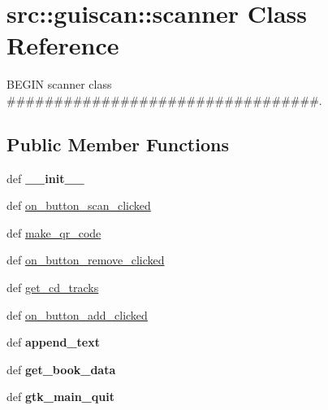 \hypertarget{classsrc_1_1guiscan_1_1scanner}{
\section{src::guiscan::scanner Class Reference}
\label{classsrc_1_1guiscan_1_1scanner}
}


BEGIN scanner class \#\#\#\#\#\#\#\#\#\#\#\#\#\#\#\#\#\#\#\#\#\#\#\#\#\#\#\#\#\#\#\#\#.  


\subsection*{Public Member Functions}
\begin{DoxyCompactItemize}
\item 
\hypertarget{classsrc_1_1guiscan_1_1scanner_ad868d76a745db2338e4f50b31b087ba6}{
def {\bfseries \_\-\_\-init\_\-\_\-}}
\label{classsrc_1_1guiscan_1_1scanner_ad868d76a745db2338e4f50b31b087ba6}

\item 
def \hyperlink{classsrc_1_1guiscan_1_1scanner_aab26c2e13df013a9c003245463b4e579}{on\_\-button\_\-scan\_\-clicked}
\item 
def \hyperlink{classsrc_1_1guiscan_1_1scanner_ae4884f53d8f5986c03dd58cc813e3c4b}{make\_\-qr\_\-code}
\item 
def \hyperlink{classsrc_1_1guiscan_1_1scanner_ad3a1150705119fe772c1132c662c0b4a}{on\_\-button\_\-remove\_\-clicked}
\item 
def \hyperlink{classsrc_1_1guiscan_1_1scanner_a48d4fbc1d9174b5f21b543af0ccd39e2}{get\_\-cd\_\-tracks}
\item 
def \hyperlink{classsrc_1_1guiscan_1_1scanner_a85859c92b9741c8f019271503a44f67e}{on\_\-button\_\-add\_\-clicked}
\item 
\hypertarget{classsrc_1_1guiscan_1_1scanner_af4989b9ea96720d251261382e4031b71}{
def {\bfseries append\_\-text}}
\label{classsrc_1_1guiscan_1_1scanner_af4989b9ea96720d251261382e4031b71}

\item 
\hypertarget{classsrc_1_1guiscan_1_1scanner_a2c5078ba404560f54bbe36d316435a09}{
def {\bfseries get\_\-book\_\-data}}
\label{classsrc_1_1guiscan_1_1scanner_a2c5078ba404560f54bbe36d316435a09}

\item 
\hypertarget{classsrc_1_1guiscan_1_1scanner_aca20c83fdf47e5eaee59f5ccfa4df81c}{
def {\bfseries gtk\_\-main\_\-quit}}
\label{classsrc_1_1guiscan_1_1scanner_aca20c83fdf47e5eaee59f5ccfa4df81c}

\end{DoxyCompactItemize}
